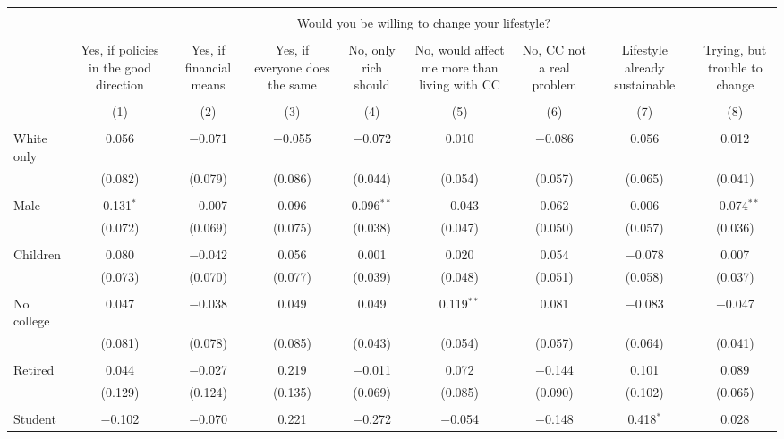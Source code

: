 
\begin{tabular}{@{\extracolsep{5pt}}lcccccccc} 
\\[-1.8ex]\hline 
\hline \\[-1.8ex] 
 & \multicolumn{8}{c}{Would you be willing to change your lifestyle?} \\ 
\cline{2-9} 
\\[-1.8ex] & Yes, if policies in the good direction & Yes, if financial means & Yes, if everyone does the same & No, only rich should & No, would affect me more than living with CC & No, CC not a real problem & Lifestyle already sustainable & Trying, but trouble to change \\ 
\\[-1.8ex] & (1) & (2) & (3) & (4) & (5) & (6) & (7) & (8)\\ 
\hline \\[-1.8ex] 
 White only & 0.056 & $-$0.071 & $-$0.055 & $-$0.072 & 0.010 & $-$0.086 & 0.056 & 0.012 \\ 
  & (0.082) & (0.079) & (0.086) & (0.044) & (0.054) & (0.057) & (0.065) & (0.041) \\ 
  & & & & & & & & \\ 
 Male & 0.131$^{*}$ & $-$0.007 & 0.096 & 0.096$^{**}$ & $-$0.043 & 0.062 & 0.006 & $-$0.074$^{**}$ \\ 
  & (0.072) & (0.069) & (0.075) & (0.038) & (0.047) & (0.050) & (0.057) & (0.036) \\ 
  & & & & & & & & \\ 
 Children & 0.080 & $-$0.042 & 0.056 & 0.001 & 0.020 & 0.054 & $-$0.078 & 0.007 \\ 
  & (0.073) & (0.070) & (0.077) & (0.039) & (0.048) & (0.051) & (0.058) & (0.037) \\ 
  & & & & & & & & \\ 
 No college & 0.047 & $-$0.038 & 0.049 & 0.049 & 0.119$^{**}$ & 0.081 & $-$0.083 & $-$0.047 \\ 
  & (0.081) & (0.078) & (0.085) & (0.043) & (0.054) & (0.057) & (0.064) & (0.041) \\ 
  & & & & & & & & \\ 
 Retired & 0.044 & $-$0.027 & 0.219 & $-$0.011 & 0.072 & $-$0.144 & 0.101 & 0.089 \\ 
  & (0.129) & (0.124) & (0.135) & (0.069) & (0.085) & (0.090) & (0.102) & (0.065) \\ 
  & & & & & & & & \\ 
 Student & $-$0.102 & $-$0.070 & 0.221 & $-$0.272 & $-$0.054 & $-$0.148 & 0.418$^{*}$ & 0.028 \\ 

\end{tabular}
